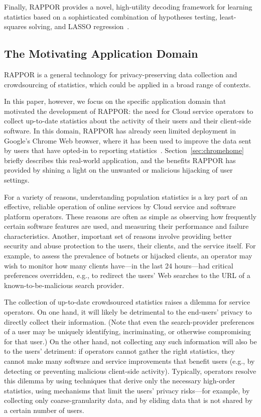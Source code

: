 \documentclass{sig-alternate-2013}
\newcommand\RAPPOR{{RAPPOR}}
\begin{document}
Finally, \RAPPOR{}
provides a novel, high-utility 
decoding framework for learning statistics
based on a sophisticated combination of
hypotheses testing,
least-squares solving, and LASSO regression~\cite{lasso}.


\subsection{The Motivating Application Domain}\label{sec:motivation}
\RAPPOR{} is
a general technology for privacy-preserving data collection and crowdsourcing of statistics,
which could be applied in a broad range of contexts. 


In this paper, however, we focus on the specific application domain
that motivated the development of \RAPPOR{}:
the need for Cloud service operators to collect up-to-date statistics 
about the activity of their users and their client-side software.
In this domain,
\RAPPOR{} has already seen limited deployment in Google's Chrome Web browser,
where it has been used
to improve the data sent by users that have opted-in to reporting statistics~\cite{ChromeRAPPORpage}.
Section~\ref{sec:chromehome} briefly describes this real-world application,
and the benefits \RAPPOR{} has provided
by shining a light on the unwanted or malicious hijacking of user settings.


For a variety of reasons,
understanding population statistics is a key part  
of an effective, reliable operation of online services
by Cloud service and software platform operators.
These reasons are often as simple as 
observing how frequently certain software features are used,
and measuring their performance and failure characteristics.
Another, important set of reasons
involve
providing better security and abuse protection to the users, their clients, and the service itself.
For example, to assess the prevalence of botnets or hijacked clients,
an operator may wish to monitor how many clients
have---in the last 24 hours---had critical preferences overridden, 
e.g., to redirect
the users' Web searches to the URL of a known-to-be-malicious search provider.



The collection of up-to-date crowdsourced statistics
raises a dilemma for service operators.
On one hand,
it will likely be detrimental to the end-users' privacy
to directly collect their information.
(Note that even the search-provider preferences of a user
may be uniquely identifying, incriminating, 
or otherwise compromising for that user.)
On the other hand,
not collecting any such information 
will also be to the users' detriment:
if operators cannot
gather the right statistics,
they cannot make
many software and service improvements that benefit users
(e.g., by detecting or preventing malicious client-side activity).
Typically, operators resolve this dilemma
by using techniques
that derive only the necessary high-order statistics,
using mechanisms
that limit the users' privacy risks---for example,
by collecting only coarse-granularity data, 
and by eliding data that is not shared by a certain number of users.
\end{document}
